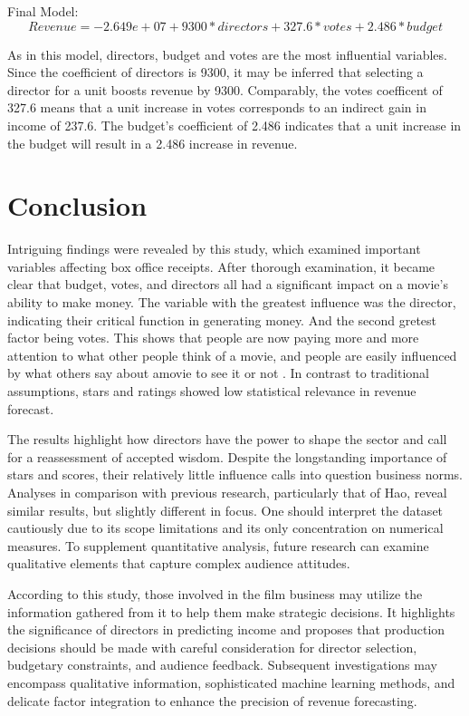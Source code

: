 \documentclass[12pt]{article}
\begin{document}
Final Model: 
\begin{equation}
Revenue = -2.649e+07 +9300*directors + 327.6*votes + 2.486*budget
\end{equation}

As in this model, directors, budget and votes are the most influential variables.
Since the coefficient of directors is 9300, it may be inferred that selecting a 
director for a unit boosts revenue by 9300. Comparably, the votes coefficent of 
327.6 means that a unit increase in votes corresponds to an indirect gain in income 
of 237.6. The budget's coefficient of 2.486 indicates that a unit increase in the 
budget will result in a 2.486 increase in revenue.

\section{Conclusion}
\label{sec:con}

Intriguing findings were revealed by this study, which examined important variables 
affecting box office receipts. After thorough examination, it became clear that budget, 
votes, and directors all had a significant impact on a movie's ability to make money. 
The variable with the greatest influence was the director, indicating their critical 
function in generating money. And the second gretest factor being votes. This shows 
that people are now paying more and more attention to what other people think of a movie, 
and people are easily influenced by what others say about amovie to see it or not \citep{2}. 
In contrast to traditional assumptions, stars and ratings showed low statistical relevance in revenue forecast.

The results highlight how directors have the power to shape the sector and call for
a reassessment of accepted wisdom. Despite the longstanding importance of stars and 
scores, their relatively little influence calls into question business norms. Analyses 
in comparison with previous research, particularly that of Hao, reveal similar results, 
but slightly different in focus. One should interpret the dataset cautiously due to its 
scope limitations and its only concentration on numerical measures. To supplement 
quantitative analysis, future research can examine qualitative elements that capture 
complex audience attitudes.

According to this study, those involved in the film business may utilize the information 
gathered from it to help them make strategic decisions. It highlights the significance of 
directors in predicting income and proposes that production decisions should be made with 
careful consideration for director selection, budgetary constraints, and audience feedback.
Subsequent investigations may encompass qualitative information, sophisticated machine 
learning methods, and delicate factor integration to enhance the precision of revenue forecasting.



\end{document}
